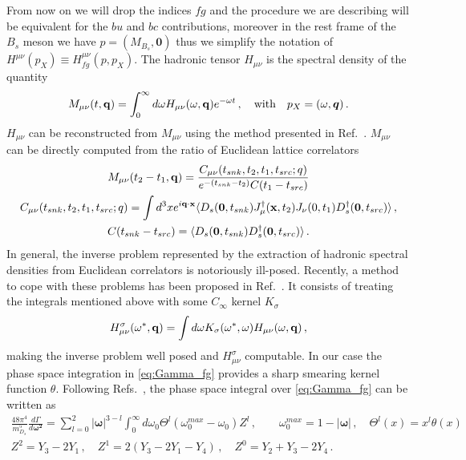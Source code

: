 From now on we will drop the indices $fg$ and the procedure we are describing will be equivalent for the $bu$ and $bc$ contributions,
moreover in the rest frame of the $B_s$ meson we have $p=(M_{B_s},\bm{0})$ thus we simplify the notation of
$H^{\mu\nu}(p_X)\equiv H^{\mu\nu}_{fg}(p,p_X)$.
The hadronic tensor $H_{\mu\nu}$ is
the spectral density of the quantity
\begin{equation}
  M_{\mu\nu}(t,{\bf q})= \int_0^{\infty}d \omega H_{\mu\nu} (\omega,{\bf q}) e^{-\omega t}\,,\quad \text{with}\quad p_X=(\omega,\bm{q})\,.
\end{equation}
$H_{\mu\nu}$ can be reconstructed from $M_{\mu\nu}$ using the method presented in
Ref.~\cite{Hansen:2019idp}. $M_{\mu\nu}$ can be directly computed from the
ratio of Euclidean lattice correlators
\begin{gather}
  M_{\mu\nu}(t_2-t_1,{\bf q})=\frac{C_{\mu\nu}(t_{snk},t_2,t_1,t_{src};q)}{e^{-(t_{snk}-t_2)}  C(t_1-t_{src}) }\label{eq:ratio_4pt_2pt}\\
  \label{eq:4pt}
  C_{\mu\nu}(t_{snk},t_2,t_1,t_{src};q)=\int d^3x e^{i{\bf q}\cdot {\bf x}}
  \langle D_s({\bf 0}, t_{snk}) J^{\dagger}_\mu({\bf x},t_2)  J_\nu(0,t_1)
  D_s^\dagger({\bf 0}, t_{src})\rangle\,,\\
  \label{eq:2pt}
  C(t_{snk}-t_{src}) =  \langle D_s({\bf 0}, t_{snk})
  D_s^\dagger({\bf 0}, t_{src})\rangle\,.
\end{gather}
In general, the inverse problem represented by the extraction of
hadronic spectral densities from Euclidean correlators is notoriously
ill-posed. Recently, a method to cope with these problems has been
proposed in Ref.~\cite{Hansen:2019idp}. It consists of treating the
integrals mentioned above with some $C_\infty$ kernel $K_\sigma$
\begin{equation}
  H^\sigma_{\mu\nu}(\omega^*, {\bf q})= \int d \omega K_\sigma( \omega^*,\omega ) H_{\mu\nu}(\omega, {\bf q})\,,
\end{equation}
making the inverse problem well posed and $H^\sigma_{\mu\nu}$ computable.
In our case the phase space integration in \eqref{eq:Gamma_fg}
provides a sharp smearing kernel function $\theta$. Following
Refs.~\cite{Gambino:2020crt, Gambino:2022dvu}, the phase space integral over
\eqref{eq:Gamma_fg} can be written as
\begin{gather}
  \frac{48 \pi^4}{m_{D_s}^5}\frac{d\Gamma}{d \bm{ \omega^2} }
  =\sum_{l=0}^2 |\bm{\omega}|^{3-l}\int_0^{\infty}d \omega_0 \Theta^l(\omega_0^{max}-\omega_0) Z^l\,,\quad\quad {\omega}_0^{max}=1-|\bm{\omega}|\,,\quad\Theta^l(x)=x^l\theta(x)\\
  Z^2=Y_3-2Y_1\,,\quad Z^1=2(Y_3-2Y_1-Y_4)\,,\quad Z^0=Y_2+Y_3-2Y_4\,.
\end{gather}
